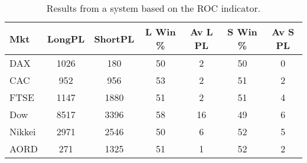 \begin{table}[ht]
\centering
\caption[Results from a system based on the ROC indicator]{Results from a system based on the ROC indicator.} 
\label{tab:mac_roc_results}
\begin{tabular}{lcccccc}
  \toprule Mkt & LongPL & ShortPL & L Win \% & Av L PL & S Win \% & Av S PL \\ 
  \midrule DAX & 1026 & 180 & 50 & 2 & 50 & 0 \\ 
  CAC & 952 & 956 & 53 & 2 & 51 & 2 \\ 
  FTSE & 1147 & 1880 & 51 & 2 & 51 & 4 \\ 
  Dow & 8517 & 3396 & 58 & 16 & 49 & 6 \\ 
  Nikkei & 2971 & 2546 & 50 & 6 & 52 & 5 \\ 
  AORD & 271 & 1325 & 51 & 1 & 52 & 2 \\ 
   \bottomrule \end{tabular}
\end{table}
